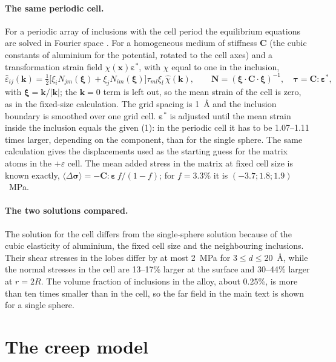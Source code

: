 \documentclass[11pt,a4paper]{article}
\begin{document}
\paragraph{The same periodic cell.} For a periodic array of inclusions with the
cell period the equilibrium equations are solved in Fourier space
\cite{MoulinecSuquet1998}. For a homogeneous medium of stiffness $\mathbf C$
(the cubic constants of aluminium for the potential, rotated to the cell axes)
and a transformation strain field $\chi(\mathbf x)\boldsymbol\varepsilon^*$, with
$\chi$ equal to one in the inclusion,
\begin{equation}
\hat\varepsilon_{ij}(\mathbf k)=\tfrac12\bigl[\xi_iN_{jm}(\boldsymbol\xi)
+\xi_jN_{im}(\boldsymbol\xi)\bigr]\tau_{ml}\xi_l\,\hat\chi(\mathbf k),
\qquad \mathbf N=(\boldsymbol\xi\cdot\mathbf C\cdot\boldsymbol\xi)^{-1},
\quad \boldsymbol\tau=\mathbf C:\boldsymbol\varepsilon^*,
\end{equation}
with $\boldsymbol\xi=\mathbf k/|\mathbf k|$; the $\mathbf k=0$ term is left out,
so the mean strain of the cell is zero, as in the fixed-size calculation. The
grid spacing is 1~\AA{} and the inclusion boundary is smoothed over one grid
cell. $\boldsymbol\varepsilon^*$ is adjusted until the mean strain inside the
inclusion equals the given (1): in the periodic cell it has to be 1.07--1.11
times larger, depending on the component, than for the single sphere. The same calculation gives the displacements
used as the starting guess for the matrix atoms in the $+\varepsilon$ cell. The
mean added stress in the matrix at fixed cell size is known exactly,
$\langle\Delta\boldsymbol\sigma\rangle=-\mathbf C:\boldsymbol\varepsilon\,f/(1-f)$;
for $f=3.3\%$ it is $(-3.7; 1.8; 1.9)$~MPa.

\paragraph{The two solutions compared.} The solution for the cell differs
from the single-sphere solution because of the cubic elasticity of
aluminium, the fixed cell size and the neighbouring inclusions. Their shear
stresses in the lobes differ by at most 2~MPa for $3\le d\le20$~\AA, while
the normal stresses in the cell are 13--17\% larger at the surface and
30--44\% larger at $r=2R$. The volume fraction of inclusions in the alloy,
about 0.25\%, is more than ten times smaller than in the cell, so the far
field in the main text is shown for a single sphere.

\section{The creep model}
\end{document}
